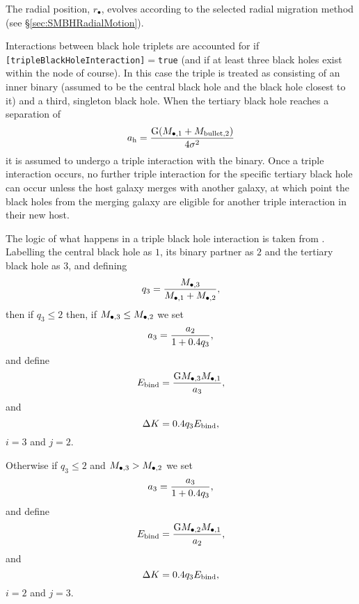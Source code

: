The radial position, $r_\bullet$, evolves according to the selected radial migration method (see \S\ref{sec:SMBHRadialMotion}).

Interactions between black hole triplets are accounted for if {\tt [tripleBlackHoleInteraction]}$=${\tt true} (and if at least three black holes exist within the node of course). In this case the triple is treated as consisting of an inner binary (assumed to be the central black hole and the black hole closest to it) and a third, singleton black hole. When the tertiary black hole reaches a separation of 
\begin{equation}
a_{\rm h}= {{\rm G} (M_{\bullet, 1} + M_{\rm bullet, 2}) \over 4 \sigma^2}
\end{equation}
it is assumed to undergo a triple interaction with the binary. Once a triple interaction occurs, no further triple interaction for the specific tertiary black hole can occur unless the host galaxy merges with another galaxy, at which point the black holes from the merging galaxy are eligible for another triple interaction in their new host.

The logic of what happens in a triple black hole interaction is taken from \cite{volonteri_assembly_2003}. Labelling the central black hole as $1$, its binary partner as $2$ and the tertiary black hole as $3$, and defining
\begin{equation}
q_3 = {M_{\bullet, 3} \over M_{\bullet, 1} + M_{\rm \bullet, 2} },
\end{equation}
then if $q_3 \le 2$ then, if $M_{\bullet, 3} \le M_{\rm \bullet, 2}$ we set
\begin{equation}
a_3 = {a_2 \over 1 + 0.4 q_3}, 
\end{equation}
and define
\begin{equation}
E_{\rm bind} = {{\rm G} M_{\bullet, 3} M_{\bullet, 1} \over a_3},
\end{equation}
and
\begin{equation}
\Delta K =0.4 q_3 E_{\rm bind},
\end{equation}
$i=3$ and $j=2$. 

Otherwise if $q_3 \le 2$ and $M_{\bullet, 3} > M_{\rm \bullet, 2}$ we set
\begin{equation}
a_3 = { a_3 \over 1 +0.4 q_3},
\end{equation}
and define
\begin{equation}
E_{\rm bind} = {{\rm G} M_{\bullet, 2} M_{\bullet, 1} \over a_2},
\end{equation}
and
\begin{equation}
 \Delta K =0.4 q_3 E_{\rm bind},
\end{equation}
$i=2$ and $j=3$.

